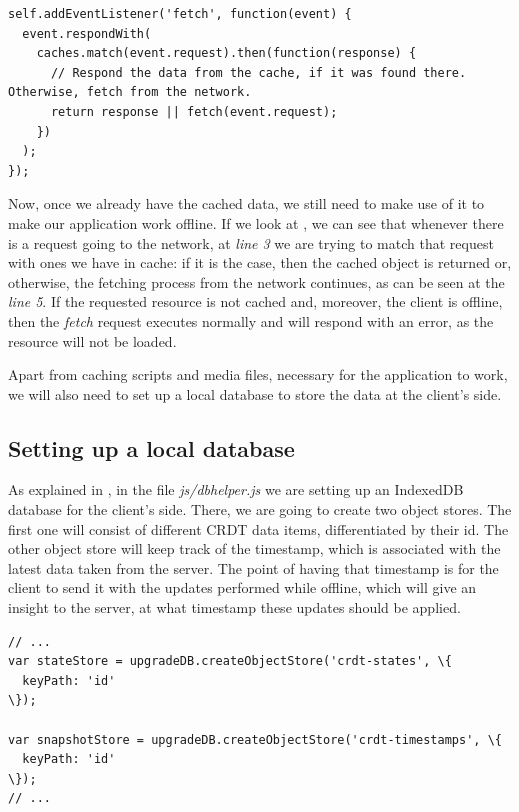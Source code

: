 \begin{lstlisting}[caption={Code for maintaining the requests of the application.}, label={lst:dev5}]
self.addEventListener('fetch', function(event) {
  event.respondWith(
    caches.match(event.request).then(function(response) {
      // Respond the data from the cache, if it was found there. Otherwise, fetch from the network.
      return response || fetch(event.request);
    })
  );
});
\end{lstlisting}

Now, once we already have the cached data, we still need to make use of it to make our application work offline. If we look at , we can see that whenever there is a request going to the network, at \textit{line 3} we are trying to match that request with ones we have in cache: if it is the case, then the cached object is returned or, otherwise, the fetching process from the network continues, as can be seen at the \textit{line 5}. If the requested resource is not cached and, moreover, the client is offline, then the \textit{fetch} request executes normally and will respond with an error, as the resource will not be loaded.

Apart from caching scripts and media files, necessary for the application to work, we will also need to set up a local database to store the data at the client's side.

\subsection*{Setting up a local database}

As explained in , in the file \textit{js/dbhelper.js} we are setting up an IndexedDB database for the client's side. There, we are going to create two object stores. The first one will consist of different CRDT data items, differentiated by their id. The other object store will keep track of the timestamp, which is associated with the latest data taken from the server. The point of having that timestamp is for the client to send it with the updates performed while offline, which will give an insight to the server, at what timestamp these updates should be applied.

\begin{lstlisting}[caption={Creating object stores in IndexedDB for CRDTs and timestamps.}, label={lst:dev6}]
// ...
var stateStore = upgradeDB.createObjectStore('crdt-states', \{
  keyPath: 'id'
\});

var snapshotStore = upgradeDB.createObjectStore('crdt-timestamps', \{
  keyPath: 'id'
\});
// ...
\end{lstlisting}

